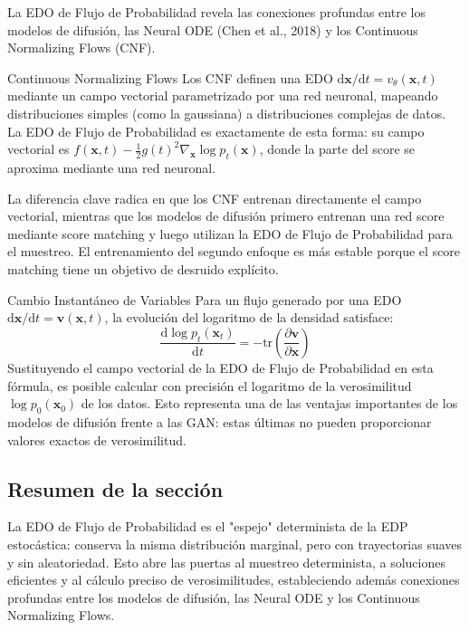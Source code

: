 \documentclass[a4paper]{article}
\begin{document}
La EDO de Flujo de Probabilidad revela las conexiones profundas entre los modelos de difusión, las Neural ODE (Chen et al., 2018) y los Continuous Normalizing Flows (CNF).

\begin{knowledgebox}{Continuous Normalizing Flows}
Los CNF definen una EDO $\mathrm{d}\mathbf{x}/\mathrm{d}t = v_\theta(\mathbf{x}, t)$ mediante un campo vectorial parametrizado por una red neuronal, mapeando distribuciones simples (como la gaussiana) a distribuciones complejas de datos. La EDO de Flujo de Probabilidad es exactamente de esta forma: su campo vectorial es $f(\mathbf{x}, t) - \frac{1}{2}g(t)^2 \nabla_{\mathbf{x}} \log p_t(\mathbf{x})$, donde la parte del score se aproxima mediante una red neuronal.

La diferencia clave radica en que los CNF entrenan directamente el campo vectorial, mientras que los modelos de difusión primero entrenan una red score mediante score matching y luego utilizan la EDO de Flujo de Probabilidad para el muestreo. El entrenamiento del segundo enfoque es más estable porque el score matching tiene un objetivo de desruido explícito.
\end{knowledgebox}

\begin{importantbox}{Cambio Instantáneo de Variables}
Para un flujo generado por una EDO $\mathrm{d}\mathbf{x}/\mathrm{d}t = \mathbf{v}(\mathbf{x}, t)$, la evolución del logaritmo de la densidad satisface:
$$
\frac{\mathrm{d}\log p_t(\mathbf{x}_t)}{\mathrm{d}t} = -\mathrm{tr}\left(\frac{\partial \mathbf{v}}{\partial \mathbf{x}}\right)
$$
Sustituyendo el campo vectorial de la EDO de Flujo de Probabilidad en esta fórmula, es posible calcular con precisión el logaritmo de la verosimilitud $\log p_0(\mathbf{x}_0)$ de los datos. Esto representa una de las ventajas importantes de los modelos de difusión frente a las GAN: estas últimas no pueden proporcionar valores exactos de verosimilitud.
\end{importantbox}

\subsection{Resumen de la sección}

La EDO de Flujo de Probabilidad es el "espejo" determinista de la EDP estocástica: conserva la misma distribución marginal, pero con trayectorias suaves y sin aleatoriedad. Esto abre las puertas al muestreo determinista, a soluciones eficientes y al cálculo preciso de verosimilitudes, estableciendo además conexiones profundas entre los modelos de difusión, las Neural ODE y los Continuous Normalizing Flows.
\end{document}
